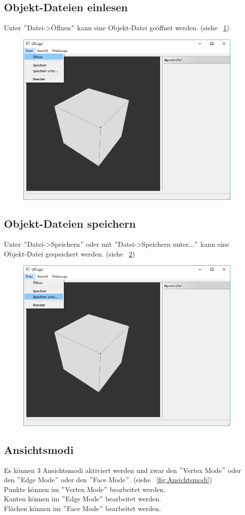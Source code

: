 \subsection{Objekt-Dateien einlesen}
Unter $"$Datei->Öffnen$"$ kann eine Objekt-Datei geöffnet werden. (siehe ~\ref{fig:DateiOeffnen})
\begin{figure}[ht!]
\centering
\includegraphics[width=0.6\linewidth]{content/pictures/0-DateiOeffnen}
\label{fig:DateiOeffnen}
\caption{}
\end{figure}
\subsection{Objekt-Dateien speichern}
Unter $"$Datei->Speichern$"$ oder mit $"$Datei->Speichern unter...$"$ kann eine Objekt-Datei gespeichert werden. (siehe ~\ref{fig:DateiSpeichern})

\begin{figure}[ht!]
	\centering
	\includegraphics[width=0.6\linewidth]{content/pictures/1-DateiSpeichern}
	\label{fig:DateiSpeichern}
	\caption{}
\end{figure}

\subsection{Ansichtsmodi}
Es können 3 Ansichtsmodi aktiviert werden und zwar den $"$Vertex Mode$"$ oder den $"$Edge Mode$"$ oder den $"$Face Mode$"$. (siehe ~\ref{fig:Ansichtsmodi})\\
Punkte können im $"$Vertex Mode$"$ bearbeitet werden.\\
Kanten können im $"$Edge Mode$"$ bearbeitet werden.\\
Flächen können im $"$Face Mode$"$ bearbeitet werden.

